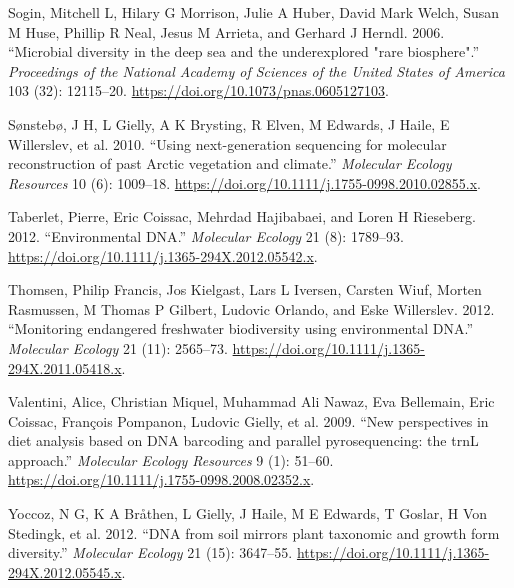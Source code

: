\documentclass[
  letterpaper,
  DIV=11,
  numbers=noendperiod]{scrreprt}
\newlength{\cslhangindent}
\newlength{\cslentryspacingunit} %
\newenvironment{CSLReferences}[2] %
 {%
  \setlength{\parindent}{0pt}
  \ifodd #1
  \let\oldpar\par
  \def\par{\hangindent=\cslhangindent\oldpar}
  \fi
  \setlength{\parskip}{#2\cslentryspacingunit}
 }%
 {}
\begin{document}
\begin{CSLReferences}{1}{0}
\leavevmode{}%
Sogin, Mitchell L, Hilary G Morrison, Julie A Huber, David Mark Welch,
Susan M Huse, Phillip R Neal, Jesus M Arrieta, and Gerhard J Herndl.
2006. {``{Microbial diversity in the deep sea and the underexplored
"rare biosphere"}.''} \emph{Proceedings of the National Academy of
Sciences of the United States of America} 103 (32): 12115--20.
\url{https://doi.org/10.1073/pnas.0605127103}.

\leavevmode{}%
Sønstebø, J H, L Gielly, A K Brysting, R Elven, M Edwards, J Haile, E
Willerslev, et al. 2010. {``{Using next-generation sequencing for
molecular reconstruction of past Arctic vegetation and climate}.''}
\emph{Molecular Ecology Resources} 10 (6): 1009--18.
\url{https://doi.org/10.1111/j.1755-0998.2010.02855.x}.

\leavevmode{}%
Taberlet, Pierre, Eric Coissac, Mehrdad Hajibabaei, and Loren H
Rieseberg. 2012. {``{Environmental DNA}.''} \emph{Molecular Ecology} 21
(8): 1789--93. \url{https://doi.org/10.1111/j.1365-294X.2012.05542.x}.

\leavevmode{}%
Thomsen, Philip Francis, Jos Kielgast, Lars L Iversen, Carsten Wiuf,
Morten Rasmussen, M Thomas P Gilbert, Ludovic Orlando, and Eske
Willerslev. 2012. {``{Monitoring endangered freshwater biodiversity
using environmental DNA}.''} \emph{Molecular Ecology} 21 (11): 2565--73.
\url{https://doi.org/10.1111/j.1365-294X.2011.05418.x}.

\leavevmode{}%
Valentini, Alice, Christian Miquel, Muhammad Ali Nawaz, Eva Bellemain,
Eric Coissac, François Pompanon, Ludovic Gielly, et al. 2009. {``{New
perspectives in diet analysis based on DNA barcoding and parallel
pyrosequencing: the trnL approach}.''} \emph{Molecular Ecology
Resources} 9 (1): 51--60.
\url{https://doi.org/10.1111/j.1755-0998.2008.02352.x}.

\leavevmode{}%
Yoccoz, N G, K A Bråthen, L Gielly, J Haile, M E Edwards, T Goslar, H
Von Stedingk, et al. 2012. {``{DNA from soil mirrors plant taxonomic and
growth form diversity}.''} \emph{Molecular Ecology} 21 (15): 3647--55.
\url{https://doi.org/10.1111/j.1365-294X.2012.05545.x}.

\end{CSLReferences}
\end{document}
